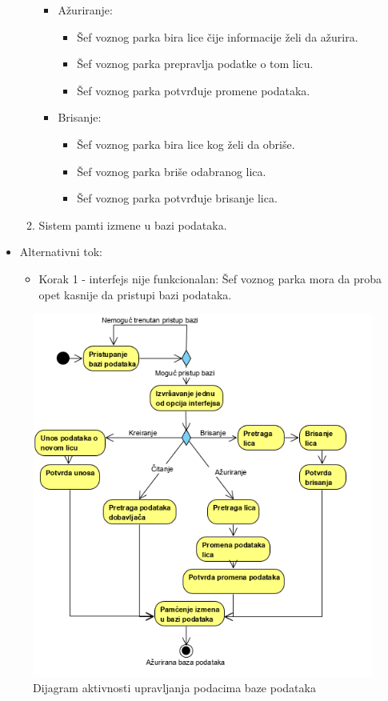 \begin{itemize}
\begin{enumerate}
\begin{itemize}
                \item Ažuriranje:
                \begin{itemize}
                    \item Šef voznog parka bira lice čije informacije želi da ažurira.
                    \item Šef voznog parka prepravlja podatke o tom licu.
                    \item Šef voznog parka potvrđuje promene podataka.
                \end{itemize}
                \item Brisanje:
                \begin{itemize}
                    \item Šef voznog parka bira lice kog želi da obriše.
                    \item Šef voznog parka briše odabranog lica.
                    \item Šef voznog parka potvrđuje brisanje lica.
                \end{itemize}
            \end{itemize}
		\item Sistem pamti izmene u bazi podataka.
		\end{enumerate}
	\item Alternativni tok:
		\begin{itemize}
		    \item Korak 1 - interfejs nije funkcionalan: Šef voznog parka mora da proba opet kasnije da pristupi bazi podataka.
		\end{itemize}
\end{itemize}

\begin{figure}[H]
\begin{left}
\includegraphics[scale=1.25]{Slike/UpravljanjePodacima.png}
\end{left}
    \caption{Dijagram aktivnosti upravljanja podacima baze podataka}
\label{fig:UpravljanjePodacima}
\end{figure}